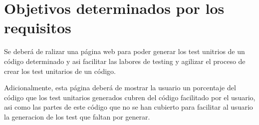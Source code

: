 
\section*{Objetivos determinados por los requisitos}

Se deberá de ralizar una página web para poder generar los test unitrios de un código determinado y asi facilitar las labores de testing y agilizar el proceso de crear los test unitarios de un código.

Adicionalmente, esta página deberá de mostrar la usuario un porcentaje del código que los test unitarios generados cubren del código facilitado por el usuario, asi como las partes de este código que no se han cubierto para facilitar al usuario la generacion de los test que faltan por generar.


